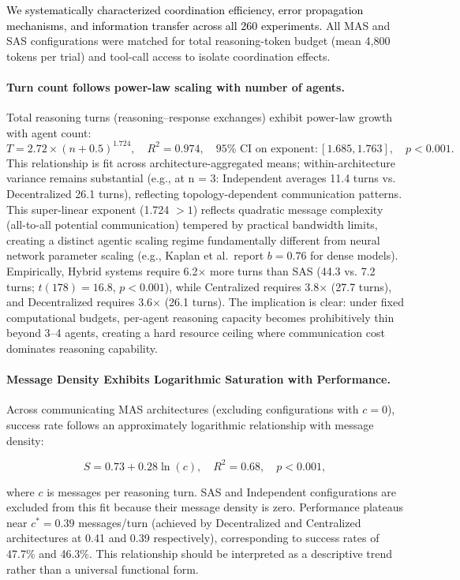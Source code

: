   \textcolor{black}{We systematically characterized coordination efficiency, error propagation mechanisms, and information transfer across all 260 experiments.} All MAS and SAS configurations were matched for total reasoning-token budget (mean 4,800 tokens per trial) and tool-call access to isolate coordination effects.
  
  \paragraph{Turn count follows power-law scaling with number of agents.}
  Total reasoning turns (reasoning--response exchanges) exhibit power-law growth with agent count:
  \[
  T = 2.72 \times (n + 0.5)^{1.724}, \quad R^2 = 0.974, \quad 95\% \text{ CI on exponent}: [1.685, 1.763], \quad p < 0.001.
  \]
  This relationship is fit across architecture-aggregated means; within-architecture variance remains substantial (e.g., at n = 3: Independent averages 11.4 turns vs. Decentralized 26.1 turns), reflecting topology-dependent communication patterns. This super-linear exponent (1.724 $> 1$) reflects quadratic message complexity (all-to-all potential communication) tempered by practical bandwidth limits, creating a distinct agentic scaling regime fundamentally different from neural network parameter scaling (e.g., Kaplan et al.\ report $b=0.76$ for dense models). Empirically, Hybrid systems require 6.2$\times$ more turns than SAS (44.3 vs. 7.2 turns; $t(178)=16.8$, $p<0.001$), while Centralized requires 3.8$\times$ (27.7 turns), and Decentralized requires 3.6$\times$ (26.1 turns). The implication is clear: under fixed computational budgets, per-agent reasoning capacity becomes prohibitively thin beyond 3--4 agents, creating a hard resource ceiling where communication cost dominates reasoning capability.
  
  \paragraph{Message Density Exhibits Logarithmic Saturation with Performance.}

  Across communicating MAS architectures (excluding configurations with $c = 0$), success rate follows an approximately logarithmic relationship with message density:

\[
S = 0.73 + 0.28 \ln(c), \quad R^2 = 0.68, \quad p < 0.001,
\]

where $c$ is messages per reasoning turn. SAS and Independent configurations are excluded from this fit because their message density is zero. Performance plateaus near $c^* = 0.39$ messages/turn (achieved by Decentralized and Centralized architectures at 0.41 and 0.39 respectively), corresponding to success rates of 47.7\% and 46.3\%. This relationship should be interpreted as a descriptive trend rather than a universal functional form.

